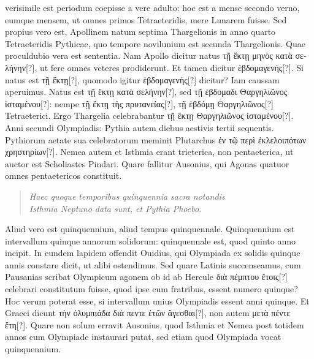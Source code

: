  verisimile est periodum
coepisse a vere adulto: hoc est a mense secondo verno, eumque
mensem, ut omnes primos Tetraeteridis, mere Lunarem fuisse.
Sed propius vero est, Apollinem natum septima Thargelionis in anno
quarto Tetraeteridis Pythicae, quo tempore novilunium est secunda
Thargelionis.
Quae proculdubio vera est sententia.
Nam Apollo dicitur
natus \textgreek{τῇ ἕκτῃ μηνὸς κατὰ σελήνην[?]},
 ut fere omnes veteres prodiderunt.
Et tamen dicitur \textgreek{ἑβδομαγενής[?]}.
Si natus est \textgreek{τῇ ἕκτῃ[?]},
 quomodo igitur \textgreek{ἑβδομαγενὴς[?]}
dicitur?
Iam caussam aperuimus.
Natus est \textgreek{τῇ ἕκτῃ κατὰ σελήνην[?]},
sed \textgreek{τῇ ἑβδομαδι Θαργηλιῶνος ἱσταμένου[?]}:
 nempe \textgreek{τῇ ἕκτῃ τὴς πρυτανείας[?]},
\textgreek{τῇ ἑβδόμῃ Θαργηλιῶνος[?]} Tetraeterici.
Ergo Thargelia celebrabantur
\textgreek{τῇ ἕκτῃ Θαργηλιῶνος ἱσταμένου[?]}.
Anni secundi Olympiadis: Pythia autem
diebus aestivis tertii sequentis.
Pythiorum aetate sua celebratorum meminit
Plutarchus \textgreek{ἐν τῷ περὶ ἐκλελοιπότων χρηστηρίων[?]}.
Nemea autem et
Isthmia erant trieterica, non pentaeterica, ut auctor est Scholiastes
Pindari.
Quare fallitur Ausonius, qui Agonas quatuor omnes pentaetericos
constituit.
\begin{verse}
\textit{Haec quoque temporibus quinquennia sacra notandis}\\
\textit{Isthmia Neptuno data sunt, et Pythia Phoebo.}
\end{verse}
Aliud vero est quinquennium, aliud tempus quinquennale.
Quinquennium est intervallum quinque annorum solidorum: quinquennale
est, quod quinto anno incipit.
In eundem lapidem offendit
Ouidius, qui Olympiada ex solidis quinque annis constare dicit, ut
alibi ostendimus.
%
Sed quare Latinis succenseamus, cum Pausanias scribat
Olympicum agonem ob id ab Hercule \textgreek{διὰ πέμπτου ἔτοις[?]} celebrari
constitutum fuisse, quod ipse cum fratribus, essent numero quinque?
Hoc verum poterat esse, si intervallum unius Olympiadis essent anni
quinque.
Et Graeci dicunt \textgreek{τὴν ὀλυμπιάδα διὰ πεντε ἐτῶν ἄγεσθαι[?]}, non
autem \textgreek{μετὰ πέντε ἔτη[?]}.
Quare non solum erravit Ausonius, quod Isthmia
et Nemea post totidem annos cum Olympiade instaurari putat, sed
etiam quod Olympiada vocat quinquennium.
